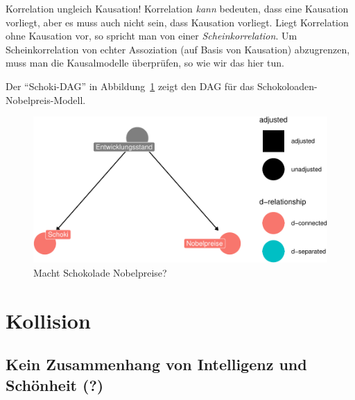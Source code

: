 \documentclass[
  a4paper,
  DIV=11]{scrreprt}
\theoremstyle{definition}
\theoremstyle{remark}
\begin{document}
\begin{tcolorbox}[enhanced jigsaw, leftrule=.75mm, left=2mm, bottomrule=.15mm, opacityback=0, coltitle=black, colbacktitle=quarto-callout-important-color!10!white, opacitybacktitle=0.6, rightrule=.15mm, toptitle=1mm, colback=white, colframe=quarto-callout-important-color-frame, arc=.35mm, toprule=.15mm, breakable, titlerule=0mm, bottomtitle=1mm, title=\textcolor{quarto-callout-important-color}{\faExclamation}\hspace{0.5em}{Wichtig}]
Korrelation ungleich Kausation! Korrelation \emph{kann} bedeuten, dass
eine Kausation vorliegt, aber es muss auch nicht sein, dass Kausation
vorliegt. Liegt Korrelation ohne Kausation vor, so spricht man von einer
\emph{Scheinkorrelation}. Um Scheinkorrelation von echter Assoziation
(auf Basis von Kausation) abzugrenzen, muss man die Kausalmodelle
überprüfen, so wie wir das hier tun.
\end{tcolorbox}

Der ``Schoki-DAG'' in Abbildung~\ref{fig-schoki-dag} zeigt den DAG für
das Schokoloaden-Nobelpreis-Modell.

\begin{figure}

{\centering \includegraphics{./kausal_files/figure-pdf/fig-schoki-dag-1.pdf}

}

\caption{\label{fig-schoki-dag}Macht Schokolade Nobelpreise?}

\end{figure}

\hypertarget{kollision}{%
\section{Kollision}\label{kollision}}

\hypertarget{kein-zusammenhang-von-intelligenz-und-schuxf6nheit}{%
\subsection{Kein Zusammenhang von Intelligenz und Schönheit
(?)}\label{kein-zusammenhang-von-intelligenz-und-schuxf6nheit}}
\end{document}
